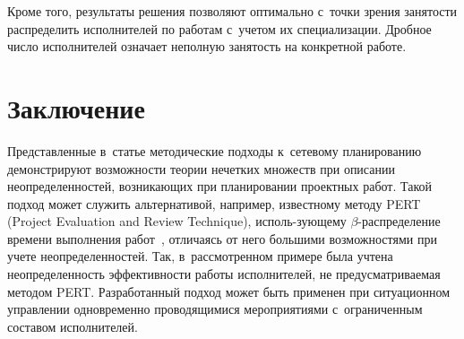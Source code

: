 \begin{multicols}{2}
  
  Кроме того, результаты решения позволяют оптимально с~точки зрения 
занятости распределить исполнителей по работам с~учетом их специализации. 
Дробное число исполнителей означает неполную занятость на конкретной 
работе.

\vspace*{-6pt}
  
\section{Заключение}

\vspace*{-2pt}
  
  Представленные в~статье методические подходы к~сетевому планированию 
демонстрируют возможности тео\-рии нечетких множеств при описании 
неопределенностей, возникающих при планировании проектных работ. 
Такой 
подход может служить альтернативой, например, известному методу PERT\linebreak
(Project Evaluation and Review Technique), 
исполь-\linebreak зующему $\beta$-рас\-пре\-де\-ле\-ние времени выполнения
работ~\cite{4-zac}, отличаясь от него большими воз\-мож\-но\-стя\-ми при учете 
неопределенностей. Так, в~рас\-смотренном примере была учтена 
неопределенность эффек\-тив\-ности работы исполнителей, не предусмат\-ри\-ва\-емая 
методом PERT. Разработанный подход может быть применен при 
ситуационном управ\-ле\-нии одновременно проводящимися мероприятиями 
с~ограниченным со\-ста\-вом исполни\-телей. 

\vspace*{-8pt}
  
{\small\frenchspacing
 {%
 \begin{thebibliography}{99}
 
 \vspace*{-4pt}
 

\end{thebibliography}}}
\end{multicols}
